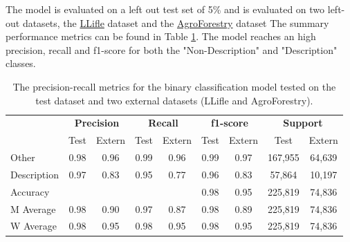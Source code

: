 \documentclass[a4paper, 12pt, oneside]{book} %
\begin{document}
The model is evaluated on a left out test set of 5\% and is evaluated on two left-out datasets, the \href{http://www.llifle.com/}{LLifle} dataset and the \href{https://www.worldagroforestry.org/}{AgroForestry} dataset
The summary performance metrics can be found in Table \ref{tab:precision_recall_metrics}.
The model reaches an high precision, recall and f1-score for both the "Non-Description" and "Description" classes.
\begin{table}[htpb]
\centering
\caption[Precision-recall metrics test and two left out datasets]{The precision-recall metrics for the binary classification model tested on the test dataset and two external datasets (LLifle and AgroForestry).}
\label{tab:precision_recall_metrics}
\begin{tabular}{@{}lcccccccc@{}}
\cmidrule(l){2-9}
 & \multicolumn{2}{c}{\textbf{Precision}} & \multicolumn{2}{c}{\textbf{Recall}} & \multicolumn{2}{c}{\textbf{f1-score}} & \multicolumn{2}{c}{\textbf{Support}} \\ \cmidrule(l){2-9} 
                 & Test & Extern & Test & Extern & Test & Extern & Test    & Extern \\ \midrule
Other            & 0.98 & 0.96   & 0.99 & 0.96   & 0.99 & 0.97   & 167,955 & 64,639 \\
Description      & 0.97 & 0.83   & 0.95 & 0.77   & 0.96 & 0.83   & 57,864  & 10,197  \\ \midrule
Accuracy         &      &        &      &        & 0.98 & 0.95   & 225,819 & 74,836 \\
M Average        & 0.98 & 0.90   & 0.97 & 0.87   & 0.98 & 0.89   & 225,819 & 74,836 \\
W Average        & 0.98 & 0.95   & 0.98 & 0.95   & 0.98 & 0.95   & 225,819 & 74,836 \\ \bottomrule
\end{tabular}
\end{table}
\end{document}
